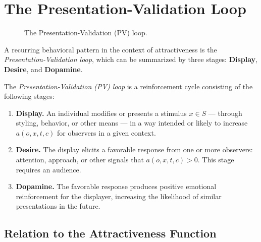 \chapter{The Presentation-Validation Loop}

\begin{figure}[h]
  \centering
  \caption{The Presentation-Validation (PV) loop.}
  \label{fig:pv-loop}
\end{figure}

A recurring behavioral pattern in the context of attractiveness is the \emph{Presentation-Validation loop}, which can be summarized by three stages: \textbf{Display}, \textbf{Desire}, and \textbf{Dopamine}.

\begin{definition}
The \emph{Presentation-Validation (PV) loop} is a reinforcement cycle consisting of the following stages:
\begin{enumerate}
  \item \textbf{Display.} An individual modifies or presents a stimulus $x \in S$ --- through styling, behavior, or other means --- in a way intended or likely to increase $a(o, x, t, c)$ for observers in a given context.
  \item \textbf{Desire.} The display elicits a favorable response from one or more observers: attention, approach, or other signals that $a(o, x, t, c) > 0$. This stage requires an audience.
  \item \textbf{Dopamine.} The favorable response produces positive emotional reinforcement for the displayer, increasing the likelihood of similar presentations in the future.
\end{enumerate}
\end{definition}

\section{Relation to the Attractiveness Function}

